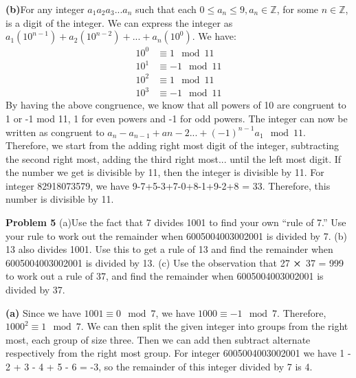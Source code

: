 \documentclass[12pt,letterpaper]{hmcpset}
\begin{document}
\begin{solution}\textbf{(b)}For any integer $a_1a_2a_3...a_n$ such that each $0\le a_n\le9, a_n\in\mathbb{Z}$, for some $n\in\mathbb{Z}$, is a digit of the integer. We can express the integer as $a_1(10^{n-1})+a_2(10^{n-2})+...+a_n(10^{0})$.  We have:
\begin{align*}
10^{0} &\equiv 1\mod 11 \\
10^{1} &\equiv -1\mod 11 \\
10^{2} &\equiv 1\mod 11 \\
10^{3} &\equiv -1\mod 11 
\end{align*}
By having the above congruence, we know that all powers of 10 are congruent to 1 or -1 mod 11, 1 for even powers and -1 for odd powers. The integer can now be written as congruent to $a_n-a_{n-1}+a{n-2}...+(-1)^{n-1}a_1 \mod 11$. Therefore, we start from the adding right most digit of the integer, subtracting the second right most, adding the third right most... until the left most digit. If the number we get is divisible by 11, then the integer is divisible by 11. For integer 82918073579, we have 9-7+5-3+7-0+8-1+9-2+8 = 33. Therefore, this number is divisible by 11. 
\end{solution}
\begin{problem} \textbf{Problem 5} 
\newline(a)Use the fact that 7 divides 1001 to find your own “rule of 7.” Use your rule to work out the remainder when 6005004003002001 is divided by 7.
\newline(b) 13 also divides 1001. Use this to get a rule of 13 and find the remainder when 6005004003002001 is divided by 13.
\newline(c) Use the observation that 27 $\cross$ 37 = 999 to work out a rule of 37, and find the remainder when 6005004003002001 is divided by 37.
\end{problem}

\begin{solution} \textbf{(a)} Since we have $1001 \equiv 0 \mod 7$, we have $1000 \equiv -1 \mod 7$. Therefore, $1000^{2} \equiv 1 \mod 7$. We can then split the given integer into groups from the right most, each group of size three. Then we can add then subtract alternate respectively from the right most group. For integer 6005004003002001 we have 1 - 2 + 3 - 4 + 5 - 6 = -3, so the remainder of this integer divided by 7 is 4.
\end{solution}
\end{document}
